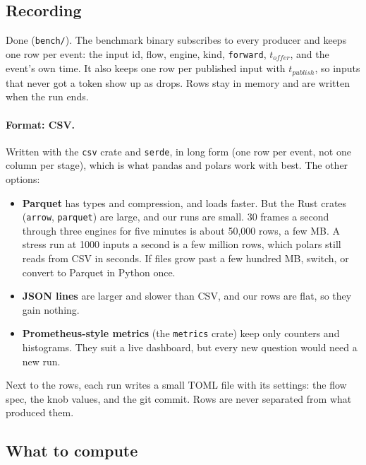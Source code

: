 \documentclass[11pt]{article}
\newcommand{\code}[1]{\texttt{#1}}
\begin{document}
\subsection{Recording}

Done (\code{bench/}). The benchmark binary subscribes to every producer and keeps one row per
event: the input id, flow, engine, kind, \code{forward}, $t_\mathit{offer}$,
and the event's own time. It also keeps one row per published input with
$t_\mathit{publish}$, so inputs that never got a token show up as drops. Rows
stay in memory and are written when the run ends.

\paragraph{Format: CSV.} Written with the \code{csv} crate and \code{serde},
in long form (one row per event, not one column per stage), which is what
pandas and polars work with best. The other options:
\begin{itemize}[nosep]
  \item \textbf{Parquet} has types and compression, and loads faster. But the
        Rust crates (\code{arrow}, \code{parquet}) are large, and our runs are
        small. 30 frames a second through three engines for five minutes is
        about 50{,}000 rows, a few MB. A stress run at 1000 inputs a second
        is a few million rows, which polars still reads from CSV in seconds.
        If files grow past a few hundred MB, switch, or convert to Parquet in
        Python once.
  \item \textbf{JSON lines} are larger and slower than CSV, and our rows are
        flat, so they gain nothing.
  \item \textbf{Prometheus-style metrics} (the \code{metrics} crate) keep
        only counters and histograms. They suit a live dashboard, but every
        new question would need a new run.
\end{itemize}
Next to the rows, each run writes a small TOML file with its settings: the
flow spec, the knob values, and the git commit. Rows are never separated from
what produced them.

\subsection{What to compute}
\end{document}

